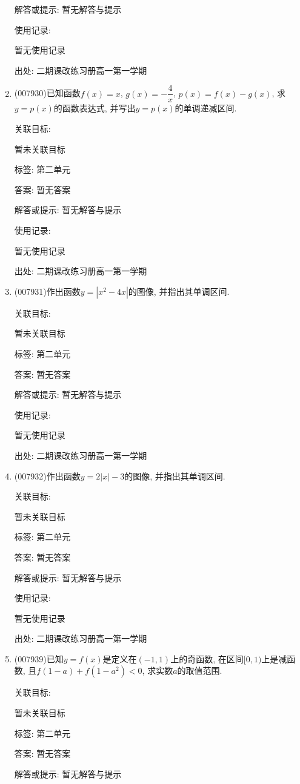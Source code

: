 \documentclass[10pt,a4paper]{article}
\begin{document}
\begin{enumerate}[1.]
解答或提示: 暂无解答与提示

使用记录:

暂无使用记录


出处: 二期课改练习册高一第一学期
\item { (007930)}已知函数$f(x)=x$, $g(x)=-\dfrac 4x$, $p(x)=f(x)-g(x)$, 求$y=p(x)$的函数表达式, 并写出$y=p(x)$的单调递减区间.


关联目标:

暂未关联目标



标签: 第二单元

答案: 暂无答案

解答或提示: 暂无解答与提示

使用记录:

暂无使用记录


出处: 二期课改练习册高一第一学期
\item { (007931)}作出函数$y=|x^2-4x|$的图像, 并指出其单调区间.


关联目标:

暂未关联目标



标签: 第二单元

答案: 暂无答案

解答或提示: 暂无解答与提示

使用记录:

暂无使用记录


出处: 二期课改练习册高一第一学期
\item { (007932)}作出函数$y=2|x|-3$的图像, 并指出其单调区间.


关联目标:

暂未关联目标



标签: 第二单元

答案: 暂无答案

解答或提示: 暂无解答与提示

使用记录:

暂无使用记录


出处: 二期课改练习册高一第一学期
\item { (007939)}已知$y=f(x)$是定义在$(-1,1)$上的奇函数, 在区间$[0,1)$上是减函数, 且$f(1-a)+f(1-a^2)<0$, 求实数$a$的取值范围.


关联目标:

暂未关联目标



标签: 第二单元

答案: 暂无答案

解答或提示: 暂无解答与提示


\end{enumerate}
\end{document}
